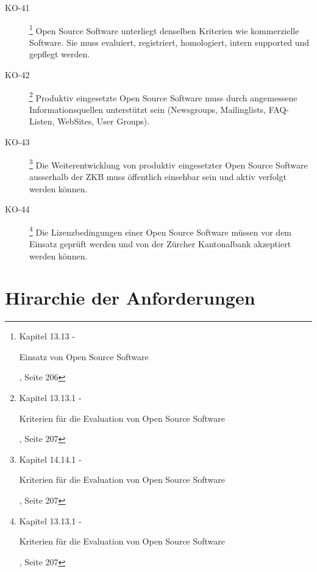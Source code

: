 \documentclass[
11pt, %
a4paper, %
BCOR25mm, %
DIV14, %
footsepline = false, %
headsepline, %
twoside, %
openright,
abstracton, %
listof=totocnumbered, %
bibliography=totocnumbered %
]{scrreprt}
\begin{document}
\begin{description}
    \item[KO-41\label{itm:KO-41}]
    \footnote{\cite{ZkbHandbuchDerItArchitektur} Kapitel 13.13 -
    \begin{itshape}Einsatz von Open Source Software\end{itshape}, Seite 206}
    Open Source Software unterliegt denselben Kriterien wie kommerzielle
    Software. Sie muss evaluiert, registriert, homologiert, intern supported
    und gepflegt werden.    
    
    \item[KO-42\label{itm:KO-42}]
    \footnote{\cite{ZkbHandbuchDerItArchitektur} Kapitel 13.13.1 -
    \begin{itshape}Kriterien für die Evaluation von Open Source
    Software\end{itshape}, Seite 207}
    Produktiv eingesetzte Open Source Software muss durch angemessene
    Informationsquellen unterstützt sein (Newsgroups, Mailinglists,
    FAQ-Listen, WebSites, User Groups).    
    
    \item[KO-43\label{itm:KO-43}]
    \footnote{\cite{ZkbHandbuchDerItArchitektur} Kapitel 14.14.1 -
    \begin{itshape}Kriterien für die Evaluation von Open Source
    Software\end{itshape}, Seite 207}
    Die Weiterentwicklung von produktiv eingesetzter Open Source Software
    ausserhalb der ZKB muss öffentlich einsehbar sein und aktiv verfolgt werden
    können.
    
    \item[KO-44\label{itm:KO-44}]
    \footnote{\cite{ZkbHandbuchDerItArchitektur} Kapitel 13.13.1 -
    \begin{itshape}Kriterien für die Evaluation von Open Source
    Software\end{itshape}, Seite 207}
    Die Lizenzbedingungen einer Open Source Software müssen vor dem Einsatz
    geprüft werden und von der Zürcher Kantonalbank akzeptiert werden können.
  \end{description}

  \section{Hirarchie der Anforderungen}
  
\end{document}
